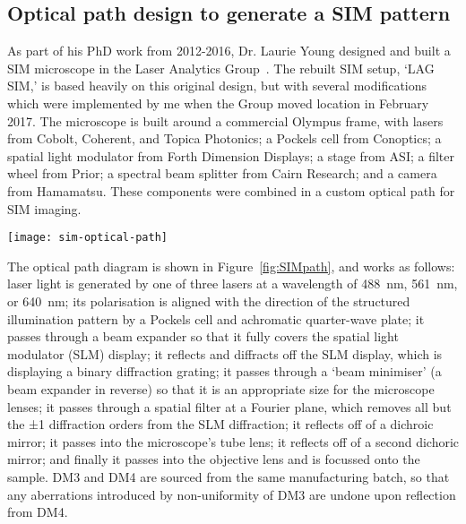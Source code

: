 \subsection{Optical path design to generate a SIM pattern} \label{sec:lagsim-path}
As part of his PhD work from 2012-2016, Dr. Laurie Young designed and built a SIM microscope in the Laser Analytics Group~\cite{young2016guide}.
The rebuilt SIM setup, `LAG SIM,' is based heavily on this original design, but with several modifications which were implemented by me when the Group moved location in February 2017.
The microscope is built around a commercial Olympus frame, with lasers from Cobolt, Coherent, and Topica Photonics; a Pockels cell from Conoptics; a spatial light modulator from Forth Dimension Displays; a stage from ASI; a filter wheel from Prior; a spectral beam splitter from Cairn Research; and a camera from Hamamatsu.
These components were combined in a custom optical path for SIM imaging. 

\begin{sidewaysfigure}[p]
\centering
\texttt{[image: sim-optical-path]}
\caption[LAG SIM: Various optics work together to pattern the laser light with a SIM pattern and apply polarisation rotation for optical sectioning and resolution enhancement]{The optical layout of the SIM aligns light from one of 3 lasers onto an optical path. The light passes through a Pockels cell and quarter wave plate for polarisation rotation, before a square-wave pattern is applied by a spatial light modulator. The patterned light is passed through a spatial mask in the Fourier plane to produce a sinusoidal pattern, which is relayed onto the sample. The objective lens collects fluorescent emission light,  which is filtered to remove any reflected excitation light before reaching the sCMOS camera.}
\label{fig:SIMpath}
\end{sidewaysfigure}

The optical path diagram is shown in Figure~\ref{fig:SIMpath}, and works as follows: laser light is generated by one of three lasers at a wavelength of \SI{488}{\nano\metre}, \SI{561}{\nano\metre}, or \SI{640}{\nano\metre}; its polarisation is aligned with the direction of the structured illumination pattern by a Pockels cell and achromatic quarter-wave plate; it passes through a beam expander so that it fully covers the spatial light modulator (SLM) display; it reflects and diffracts off the SLM display, which is displaying a binary diffraction grating; it passes through a `beam minimiser' (a beam expander in reverse) so that it is an appropriate size for the microscope lenses; it passes through a spatial filter at a Fourier plane, which removes all but the ±1 diffraction orders from the SLM diffraction; it reflects off of a dichroic mirror; it passes into the microscope's tube lens; it reflects off of a second dichoric mirror; and finally it passes into the objective lens and is focussed onto the sample.
DM3 and DM4 are sourced from the same manufacturing batch, so that any aberrations introduced by non-uniformity of DM3 are undone upon reflection from DM4.


